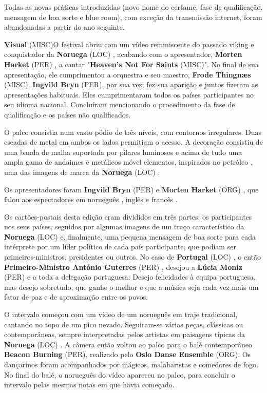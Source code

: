 \documentclass[12pt,a4paper]{article}
\begin{document}
Todas as novas práticas introduzidas (novo nome do certame, fase de qualificação, mensagem de boa sorte e blue room), com exceção da transmissão internet, foram abandonadas a partir do ano seguinte.



\textbf{Visual} (MISC)O festival abriu com um vídeo reminiscente do passado viking e conquistador da \textbf{Noruega} (LOC) , acabando com o apresentador, \textbf{Morten Harket} (PER) , a cantar "\textbf{Heaven's Not For Saints} (MISC)". No final de sua apresentação, ele cumprimentou a orquestra e seu maestro, \textbf{Frode Thingnæs} (MISC). \textbf{Ingvild Bryn} (PER), por sua vez, fez sua aparição e juntos fizeram as apresentações habituais. Eles cumprimentaram todos os países participantes no seu idioma nacional. Concluíram mencionando o procedimento da fase de qualificação e os países não qualificados.

O palco consistia num vasto pódio de três níveis, com contornos irregulares. Duas escadas de metal em ambos os lados permitiam o acesso. A decoração consistiu de uma banda de malha suportada por pilares luminosos e acima de tudo uma ampla gama de andaimes e metálicos móvel elementos, inspirados no petróleo , uma das imagens de marca da \textbf{Noruega} (LOC) .

Os apresentadores foram \textbf{Ingvild Bryn} (PER) e \textbf{Morten Harket} (ORG) , que falou aos espectadores em norueguês , inglês e francês .

Os cartões-postais desta edição eram divididos em três partes: os participantes nos seus países, seguidos por algumas imagens de um traço característico da \textbf{Noruega} (LOC) e, finalmente, uma pequena mensagem de boa sorte para cada intérprete por um líder político de cada país participante, que podiam ser primeiros-ministros, presidentes ou outros. No caso de \textbf{Portugal} (LOC) , o então \textbf{Primeiro-Ministro António Guterres} (PER) , desejou a \textbf{Lúcia Moniz} (PER) e a toda a delegação portuguesa: Desejo felicidades à equipa portuguesa, mas desejo sobretudo, que ganhe o melhor e que a música seja cada vez mais um fator de paz e de aproximação entre os povos.

O intervalo começou com um vídeo de um norueguês em traje tradicional, cantando no topo de um pico nevado. Seguiram-se várias peças, clássicas ou contemporâneas, sempre interpretadas pelos artistas em paisagens típicas da \textbf{Noruega} (LOC) . A câmera então voltou ao palco para o balé contemporâneo \textbf{Beacon Burning} (PER), realizado pelo \textbf{Oslo Danse Ensemble} (ORG). Os dançarinos foram acompanhados por mágicos, malabaristas e comedores de fogo. No final do balé, o norueguês do vídeo apareceu no palco, para concluir o intervalo pelas mesmas notas em que havia começado.
\end{document}
